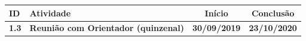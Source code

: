 \begin{table}[H]
    \begin{center}
        \begin{tabular}{| l | m{8.5cm} | c | c |}
            \hline
        	\textbf{ID} & \textbf{Atividade} & \textbf{Início} & \textbf{Conclusão}\\ [0.5ex]
        	\hline
        	\hline
        	\textbf{1.3} & \quad \textbf{Reunião com Orientador (quinzenal)} & \textbf{30/09/2019} & \textbf{23/10/2020} \\ \hline

\end{tabular}
\end{center}
\end{table}
